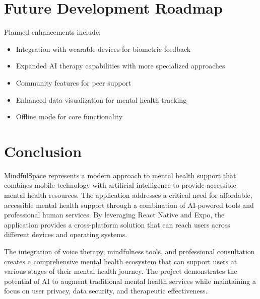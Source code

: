 \documentclass[11pt,a4paper]{article}
\begin{document}
\section{Future Development Roadmap}
Planned enhancements include:
\begin{itemize}
    \item Integration with wearable devices for biometric feedback
    \item Expanded AI therapy capabilities with more specialized approaches
    \item Community features for peer support
    \item Enhanced data visualization for mental health tracking
    \item Offline mode for core functionality
\end{itemize}

\section{Conclusion}
MindfulSpace represents a modern approach to mental health support that combines mobile technology with artificial intelligence to provide accessible mental health resources. The application addresses a critical need for affordable, accessible mental health support through a combination of AI-powered tools and professional human services. By leveraging React Native and Expo, the application provides a cross-platform solution that can reach users across different devices and operating systems.

The integration of voice therapy, mindfulness tools, and professional consultation creates a comprehensive mental health ecosystem that can support users at various stages of their mental health journey. The project demonstrates the potential of AI to augment traditional mental health services while maintaining a focus on user privacy, data security, and therapeutic effectiveness.
\end{document}

